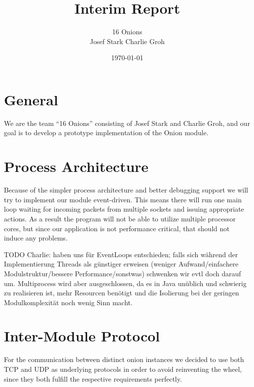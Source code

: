 \documentclass{article}
\begin{document}
\title{\Huge Interim Report \normalsize}
\date{\today}
\author{\LARGE 16 Onions \normalsize \\[5pt] Josef Stark \hspace{20pt} Charlie Groh}
\maketitle
{\let\thefootnote\relax{}}

\section{General}
We are the team ``16 Onions'' consisting of Josef Stark and Charlie Groh,
and our goal is to develop a prototype implementation of the Onion module.

\section{Process Architecture}
Because of the simpler process architecture and better debugging support we will try to implement
our module event-driven. This means there will run one main loop waiting for incoming packets from
multiple sockets and issuing appropriate actions. As a result the program will not be able to
utilize multiple processor cores, but since our application is not performance critical, that
should not induce any problems.


TODO Charlie: haben uns für EventLoops entschieden; falls sich während der Implementierung Threads als günstiger erweisen (weniger Aufwand/einfachere Modulstruktur/bessere Performance/sonstwas) schwenken wir evtl doch darauf um. Multiprocess wird aber ausgeschlossen, da es in Java unüblich und schwierig zu realisieren ist, mehr Resourcen benötigt und die Isolierung bei der geringen Modulkomplexität noch wenig Sinn macht.

\section{Inter-Module Protocol}
For the communication between distinct onion instances we decided to use both TCP and UDP as underlying protocols in order to avoid reinventing the wheel, since they both fulfill the respective requirements perfectly.
\end{document}
